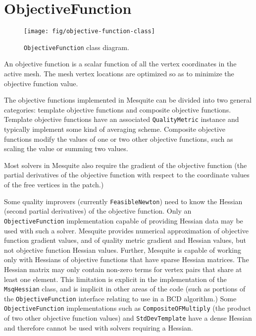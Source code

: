 \documentclass{article}
\begin{document}
\section{ObjectiveFunction}

\label{sec:ObjectiveFunction}

\begin{figure}[htb]
\begin{center}
\texttt{[image: fig/objective-function-class]}
\caption{\texttt{ObjectiveFunction} class diagram.\label{fig:objfunc-class}}
\end{center}
\end{figure}

An objective function is a scalar function of all the vertex coordinates in the active mesh.  The mesh vertex locations are optimized so as to minimize the objective function value.

The objective functions implemented in Mesquite can be divided into two general categories: template objective functions and composite objective functions.  Template objective functions have an associated \texttt{QualityMetric} instance and typically implement some kind of averaging scheme.  Composite objective functions modify the values of one or two other objective functions, such as scaling the value or summing two values.

Most solvers in Mesquite also require the gradient of the objective function (the partial derivatives of the objective function with respect to the coordinate values of the free vertices in the patch.)

\label{sec:Hessian} Some quality improvers (currently \texttt{FeasibleNewton}) need to know the Hessian (second partial derivatives) of the objective function.  Only an \texttt{ObjectiveFunction} implementation capable of providing Hessian data may be used with such a solver.  Mesquite provides numerical approximation of objective function gradient values, and of quality metric gradient and Hessian values, but not objective function Hessian values.  Further, Mesquite is capable of working only with Hessians of objective functions that have sparse Hessian matrices.  The Hessian matrix may only contain non-zero terms for vertex pairs that share at least one element.  This limitation is explicit in the implementation of the \texttt{MsqHessian} class, and is implicit in other areas of the code (such as portions of the \texttt{ObjectiveFunction} interface relating to use in a BCD algorithm.)  Some \texttt{ObjectiveFunction} implementations such as \texttt{CompositeOFMultiply} (the product of two other objective function values) and \texttt{StdDevTemplate} have a dense Hessian and therefore cannot be used with solvers requiring a Hessian.
\end{document}
